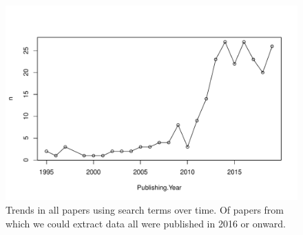 \documentclass[11pt,letter]{article}
\begin{document}
\begin{figure}[t!]
\centering
\includegraphics[width=1\textwidth]{..//..//R/graphs/otherdat/papersovertime.pdf}
\caption{Trends in all papers using search terms over time. Of papers from which we could extract data all were published in 2016 or onward.}
  \label{fig:papertrends}
\end{figure}
 
\end{document}
